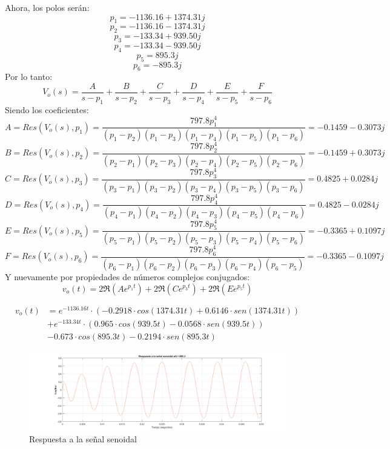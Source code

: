 Ahora, los polos serán:
$$
    p_1 = -1136.16 + 1374.31j
$$
$$
    p_2 = -1136.16 - 1374.31j
$$
$$
    p_3 = -133.34 + 939.50j
$$
$$
    p_4 = -133.34 - 939.50j
$$
$$
    p_5 = 895.3j
$$
$$
    p_6 = -895.3j
$$
\vskip0.5cm
Por lo tanto:
\vskip0.5cm
$$
V_o(s) = \frac{A}{s-p_1} + \frac{B}{s-p_2} + \frac{C}{s-p_3} + \frac{D}{s-p_4} + \frac{E}{s-p_5} + \frac{F}{s-p_6}
$$
\vskip0.5cm
Siendo los coeficientes:
\vskip0.5cm
$$
A = Res(V_o(s), p_1) = \frac{797.8 p_1^4}{(p_1-p_2)(p_1-p_3)(p_1-p_4)(p_1-p_5)(p_1-p_6)} = -0.1459 - 0.3073j
$$
$$
B = Res(V_o(s), p_2) = \frac{797.8 p_2^4}{(p_2-p_1)(p_2-p_3)(p_2-p_4)(p_2-p_5)(p_2-p_6)} = -0.1459 + 0.3073j
$$
$$
C = Res(V_o(s), p_3) = \frac{797.8 p_3^4}{(p_3-p_1)(p_3-p_2)(p_3-p_4)(p_3-p_5)(p_3-p_6)} = 0.4825 + 0.0284j
$$
$$
D = Res(V_o(s), p_4) = \frac{797.8 p_4^4}{(p_4-p_1)(p_4-p_2)(p_4-p_3)(p_4-p_5)(p_4-p_6)} = 0.4825 - 0.0284j
$$
$$
E = Res(V_o(s), p_5) = \frac{797.8 p_5^4}{(p_5-p_1)(p_5-p_2)(p_5-p_3)(p_5-p_4)(p_5-p_6)} = -0.3365 + 0.1097j
$$
$$
F = Res(V_o(s), p_6) = \frac{797.8 p_6^4}{(p_6-p_1)(p_6-p_2)(p_6-p_3)(p_6-p_4)(p_6-p_5)} = -0.3365 - 0.1097j
$$
\vskip0.5cm
Y nuevamente por propiedades de números complejos conjugados:
\vskip0.5cm
$$
    v_o(t) = 2\Re(Ae^{p_1t}) + 2\Re(Ce^{p_3t}) + 2\Re(Ee^{p_5t})
$$
\vskip0.5cm

\begin{align*}
    v_o(t) & = e^{-1136.16t} \cdot (-0.2918 \cdot cos(1374.31t) + 0.6146 \cdot sen(1374.31t)) \\
           & + e^{-133.34t} \cdot (0.965 \cdot cos(939.5t) - 0.0568 \cdot sen(939.5t)) \\
           & - 0.673 \cdot cos(895.3t) - 0.2194 \cdot sen(895.3t)
\end{align*}

\begin{figure}[H]
    \centering
    \includegraphics[width=1\textwidth]{resources/RespuestaAlSinusoide.png}
    \caption{Respuesta a la señal senoidal}
\end{figure}